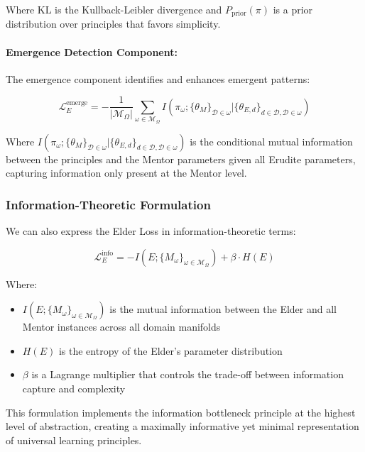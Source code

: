 Where $\text{KL}$ is the Kullback-Leibler divergence and $P_{\text{prior}}(\pi)$ is a prior distribution over principles that favors simplicity.

\paragraph{Emergence Detection Component:}
The emergence component identifies and enhances emergent patterns:

\begin{equation}
\mathcal{L}_E^{\text{emerge}} = -\frac{1}{|\mathcal{M}_{\Omega}|} \sum_{\omega \in \mathcal{M}_{\Omega}} I(\pi_{\omega}; \{\theta_{M}\}_{\mathcal{D} \in \omega} | \{\theta_{E,d}\}_{d \in \mathcal{D}, \mathcal{D} \in \omega})
\end{equation}

Where $I(\pi_{\omega}; \{\theta_{M}\}_{\mathcal{D} \in \omega} | \{\theta_{E,d}\}_{d \in \mathcal{D}, \mathcal{D} \in \omega})$ is the conditional mutual information between the principles and the Mentor parameters given all Erudite parameters, capturing information only present at the Mentor level.

\subsubsection{Information-Theoretic Formulation}

We can also express the Elder Loss in information-theoretic terms:

\begin{equation}
\mathcal{L}_E^{\text{info}} = -I(E; \{M_{\omega}\}_{\omega \in \mathcal{M}_{\Omega}}) + \beta \cdot H(E)
\end{equation}

Where:
\begin{itemize}
\item $I(E; \{M_{\omega}\}_{\omega \in \mathcal{M}_{\Omega}})$ is the mutual information between the Elder and all Mentor instances across all domain manifolds
\item $H(E)$ is the entropy of the Elder's parameter distribution
\item $\beta$ is a Lagrange multiplier that controls the trade-off between information capture and complexity
\end{itemize}

This formulation implements the information bottleneck principle at the highest level of abstraction, creating a maximally informative yet minimal representation of universal learning principles.

